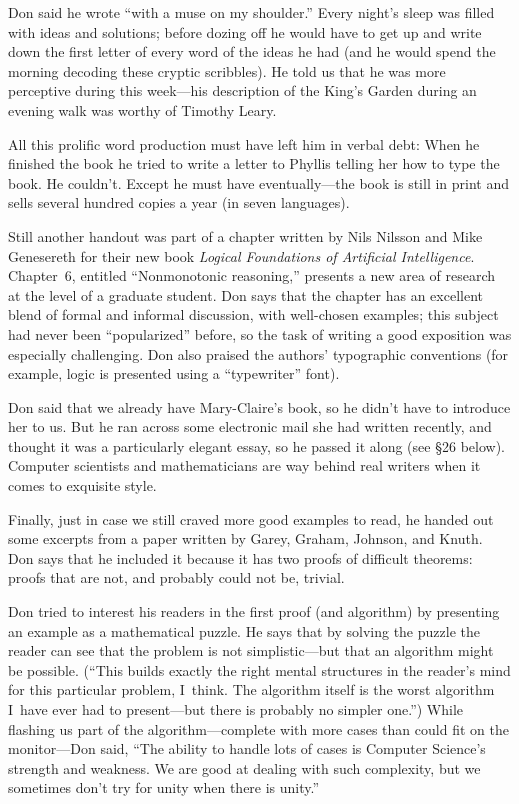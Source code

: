     Don said he wrote ``with a muse on my shoulder.''  Every night's sleep was
    filled with ideas and solutions; before dozing off he would have to get 
up and write down the first
    letter of every word of the ideas he had (and he would
    spend the morning decoding these cryptic scribbles).  He told us that he
    was more perceptive during this week---his description of the King's
    Garden during an evening  walk was worthy of Timothy Leary.  
    
    All this prolific word production must have left him in verbal debt: 
    When he finished the book he tried to write a letter to Phyllis telling 
    her how to type the book.  He couldn't.  Except he must have 
eventually---the 
book is still in print and sells several hundred copies a year (in seven languages).
    
\goodbreak\medskip
Still another handout was part of a chapter written by Nils
Nilsson and Mike Genesereth for their new book {\sl Logical Foundations of
Artificial Intelligence}.  Chapter~6, entitled ``Nonmonotonic reasoning,''
presents a new area of research at the level of a graduate student.  Don
says that the chapter has an excellent blend of formal and
informal discussion, with well-chosen examples; this subject
had never been ``popularized'' before, so the task of writing a good
exposition was especially challenging. Don also praised the authors'
typographic conventions (for example,
logic is presented using a ``typewriter'' font).

\smallskip
Don said that we already have Mary-Claire's book, so he didn't have to
introduce her to us. But he ran across some electronic mail she had
written recently, and thought it was a particularly elegant essay, so
he passed it along (see \S{26} below). Computer scientists and mathematicians
are way behind real writers when it comes to exquisite style.

Finally, just in case we still craved more good examples to read,
he handed out some
excerpts from a paper written by Garey, Graham,
Johnson, and Knuth.  Don says that he included it because it has two
proofs of difficult theorems: proofs that are not, and probably could not be,
trivial.  

Don tried to interest his readers in the first proof (and algorithm) by
presenting an example as a mathematical puzzle.  He says that by solving the
puzzle the reader can see that the problem is not simplistic---but that an
algorithm might be possible. 
(``This builds exactly the right mental structures in the reader's
mind for this particular problem, I~think.
The algorithm itself is the worst algorithm
I~have ever had to present---but there is probably 
no simpler one.'')  While
flashing us part of the algorithm---complete with more cases than could fit
on the monitor---Don said, ``The ability to handle lots of cases is Computer
Science's strength and weakness.  We are good at dealing with such
complexity, but we sometimes don't try for unity when there is unity.''

